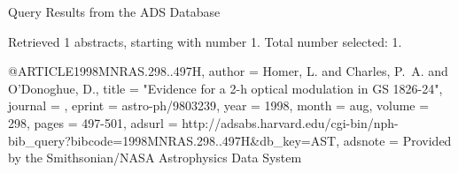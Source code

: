 Query Results from the ADS Database


Retrieved 1 abstracts, starting with number 1.  Total number selected: 1.

@ARTICLE{1998MNRAS.298..497H,
   author = {{Homer}, L. and {Charles}, P.~A. and {O'Donoghue}, D.},
    title = "{Evidence for a 2-h optical modulation in GS 1826-24}",
  journal = {\mnras},
   eprint = {astro-ph/9803239},
     year = 1998,
    month = aug,
   volume = 298,
    pages = {497-501},
   adsurl = {http://adsabs.harvard.edu/cgi-bin/nph-bib_query?bibcode=1998MNRAS.298..497H&db_key=AST},
  adsnote = {Provided by the Smithsonian/NASA Astrophysics Data System}
}


